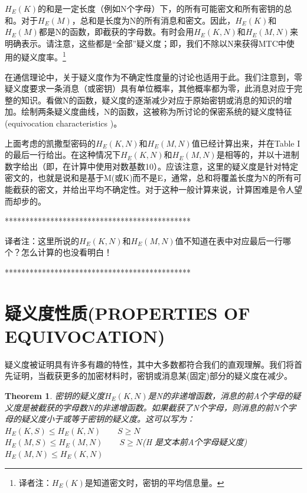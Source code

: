 \documentclass[]{article}
\newtheorem{theorem}{Theorem}
\begin{document}
$H_E(K)$的和是一定长度（例如N个字母）下，的所有可能密文和所有密钥的总和。对于$H_E(M)$，总和是长度为N的所有消息和密文。因此，$H_E(K)$和$H_E(M)$都是N的函数，即截获的字母数。有时会用$H_E(K,N)$和$H_E(M,N)$来明确表示。请注意，这些都是“全部”疑义度；即，我们不除以N来获得MTC中使用的疑义度率。\footnote{译者注：$H_E(K)$是知道密文时，密钥的平均信息量。}

在通信理论中，关于疑义度作为不确定性度量的讨论也适用于此。我们注意到，零疑义度要求一条消息（或密钥）具有单位概率，其他概率都为零，此消息对应于完整的知识。看做N的函数，疑义度的逐渐减少对应于原始密钥或消息的知识的增加。绘制两条疑义度曲线，N的函数，这被称为所讨论的保密系统的疑义度特征(equivocation characteristics )。


上面考虑的凯撒型密码的$H_E(K,N)$和$H_E(M,N)$值已经计算出来，并在Table I的最后一行给出。在这种情况下$H_E(K,N)$和$H_E(M,N)$是相等的，并以十进制数字给出（即，在计算中使用对数基数10）。应该注意，这里的疑义度是针对特定密文的，也就是说和是基于M(或K)而不是E，通常，总和将覆盖长度为N的所有可能截获的密文，并给出平均不确定性。对于这种一般计算来说，计算困难是令人望而却步的。

\vspace{1cm}
*********************************************\par
译者注：这里所说的$H_E(K,N)$和$H_E(M,N)$值不知道在表中对应最后一行哪个？怎么计算的也没看明白！\par
*********************************************\par
\newpage
%   
%

\section{疑义度性质(PROPERTIES OF EQUIVOCATION)}

疑义度被证明具有许多有趣的特性，其中大多数都符合我们的直观理解。我们将首先证明，当截获更多的加密材料时，密钥或消息某(固定)部分的疑义度在减少。

\begin{theorem}
	密钥的疑义度$H_E(K,N)$是N的非递增函数，消息的前A个字母的疑义度是被截获的字母数N的非递增函数。如果截获了N个字母，则消息的前N个字母的疑义度小于或等于密钥的疑义度。这可以写为：\\
	$H_E(K,S) \leq H_E(K,N) \qquad S\geq N$\\
	$H_E(M,S) \leq H_E(M,N) \qquad S\geq N$(H 是文本前A个字母疑义度)\\
	$H_E(M,N) \leq H_E(K,N)$
\end{theorem}
\end{document}
